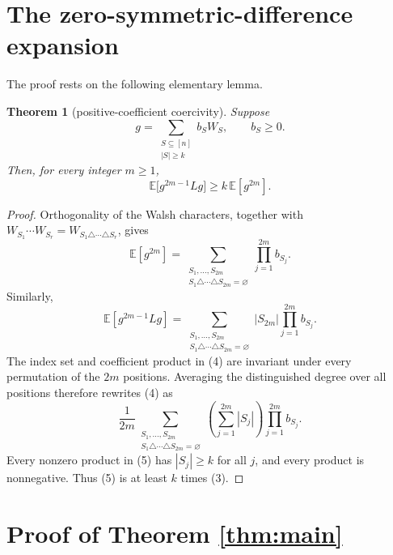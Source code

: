 \documentclass[11pt]{article}
\newtheorem{theorem}{Theorem}
\newcommand{\E}{\mathbb E}
\begin{document}
\section{The zero-symmetric-difference expansion}

The proof rests on the following elementary lemma.

\begin{theorem}[positive-coefficient coercivity]\label{thm:coercive}
Suppose
\[
 g=\sum_{\substack{S\subseteq[n]\\|S|\ge k}}b_SW_S,
 \qquad b_S\ge0.
\]
Then, for every integer $m\ge1$,
\[
 \E\big[g^{2m-1}Lg\big]\ge k\,\E[g^{2m}].                      \tag{2}
\]
\end{theorem}

\begin{proof}
Orthogonality of the Walsh characters, together with
$W_{S_1}\cdots W_{S_r}=W_{S_1\triangle\cdots\triangle S_r}$,
gives
\[
 \E[g^{2m}]
 =
 \sum_{\substack{S_1,\ldots,S_{2m}\\
 S_1\triangle\cdots\triangle S_{2m}=\varnothing}}
 \prod_{j=1}^{2m}b_{S_j}.                                     \tag{3}
\]
Similarly,
\[
 \E[g^{2m-1}Lg]
 =
 \sum_{\substack{S_1,\ldots,S_{2m}\\
 S_1\triangle\cdots\triangle S_{2m}=\varnothing}}
 |S_{2m}|\prod_{j=1}^{2m}b_{S_j}.                             \tag{4}
\]
The index set and coefficient product in (4) are invariant under every
permutation of the $2m$ positions.  Averaging the distinguished degree
over all positions therefore rewrites (4) as
\[
 \frac1{2m}
 \sum_{\substack{S_1,\ldots,S_{2m}\\
 S_1\triangle\cdots\triangle S_{2m}=\varnothing}}
 \left(\sum_{j=1}^{2m}|S_j|\right)
 \prod_{j=1}^{2m}b_{S_j}.                                     \tag{5}
\]
Every nonzero product in (5) has $|S_j|\ge k$ for all $j$, and every
product is nonnegative.  Thus (5) is at least $k$ times (3).
\end{proof}

\section{Proof of Theorem \ref{thm:main}}
\end{document}
